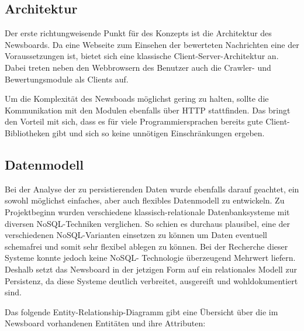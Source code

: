 \subsection{Architektur}
Der erste richtungweisende Punkt für des Konzepts ist die Architektur des Newsboards.
Da eine Webseite zum Einsehen der bewerteten Nachrichten eine der Voraussetzungen ist,
bietet sich eine klassische Client-Server-Architektur an.
Dabei treten neben den Webbrowsern des Benutzer auch die Crawler-
und Bewertungsmodule als Clients auf.

Um die Komplexität des Newsboads möglichst gering zu halten, sollte die Kommunikation
mit den Modulen ebenfalls über HTTP stattfinden. Das bringt den Vorteil mit sich,
dass es für viele Programmiersprachen bereits gute Client-Bibliotheken gibt
und sich so keine unnötigen Einschränkungen ergeben.

\subsection{Datenmodell}
Bei der Analyse der zu persistierenden Daten wurde ebenfalls darauf geachtet, ein
sowohl möglichst einfaches, aber auch flexibles Datenmodell zu entwickeln. Zu Projektbeginn wurden verschiedene klassisch-relationale Datenbanksysteme mit diversen 
NoSQL-Techniken verglichen. So schien es durchaus plausibel, eine der verschiedenen
NoSQL-Varianten einsetzen zu können um Daten eventuell schemafrei und somit sehr flexibel 
ablegen zu können. Bei der Recherche dieser Systeme konnte jedoch keine NoSQL-
Technologie überzeugend Mehrwert liefern. Deshalb setzt das Newsboard in der jetzigen Form 
auf ein relationales Modell zur Persistenz, da diese Systeme deutlich 
verbreitet, ausgereift und wohldokumentiert sind.

Das folgende Entity-Relationship-Diagramm gibt eine Übersicht über die im Newsboard
vorhandenen Entitäten und ihre Attributen:

